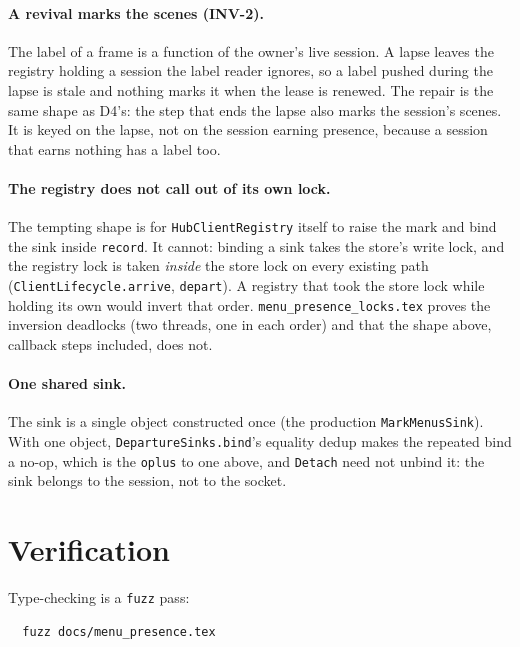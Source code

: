 \documentclass[a4paper,10pt,fleqn]{article}
\begin{document}
\paragraph{A revival marks the scenes (INV-2).}
The label of a frame is a function of the owner's live session. A lapse leaves
the registry holding a session the label reader ignores, so a label pushed
during the lapse is stale and nothing marks it when the lease is renewed. The
repair is the same shape as D4's: the step that ends the lapse also marks the
session's scenes. It is keyed on the lapse, not on the session earning
presence, because a session that earns nothing has a label too.

\paragraph{The registry does not call out of its own lock.}
The tempting shape is for \texttt{HubClientRegistry} itself to raise the mark
and bind the sink inside \texttt{record}. It cannot: binding a sink takes the
store's write lock, and the registry lock is taken \emph{inside} the store
lock on every existing path (\texttt{ClientLifecycle.arrive},
\texttt{depart}). A registry that took the store lock while holding its own
would invert that order. \texttt{menu\_presence\_locks.tex} proves the
inversion deadlocks (two threads, one in each order) and that the shape above,
callback steps included, does not.

\paragraph{One shared sink.}
The sink is a single object constructed once (the production
\texttt{MarkMenusSink}). With one object, \texttt{DepartureSinks.bind}'s equality
dedup makes the repeated bind a no-op, which is the \texttt{oplus} to one above,
and \texttt{Detach} need not unbind it: the sink belongs to the session, not to
the socket.

\section{Verification}
\label{sec:verify}

Type-checking is a \texttt{fuzz} pass:
\begin{verbatim}
  fuzz docs/menu_presence.tex
\end{verbatim}
\end{document}
